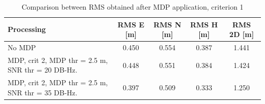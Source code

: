 \begin{table}[H]
	\centering
	\begin{tabular}{|p{4.5cm}|c|c|c|c|}
	\hline
	\textbf{Processing} & \textbf{RMS E [m]} & \textbf{RMS N [m]} &
	\textbf{RMS H [m]}&\textbf{RMS 2D [m]}\\
    \hline
	No MDP & 0.450 & 0.554& 0.387&1.441\\  
    \hline
	 MDP, crit 2, MDP thr = 2.5 m, SNR thr = 20 DB-Hz.& 0.448 & 0.551& 0.384&1.424\\ \hline
	 MDP, crit 2, MDP thr = 2.5 m, SNR thr = 35 DB-Hz.& 0.397 & 0.509& 0.333&1.250\\ \hline
	\end{tabular} 
	\caption{Comparison between RMS obtained after MDP application, criterion 1}
	\label{tab:mdp_crit2_mdp_table}
\end{table}

